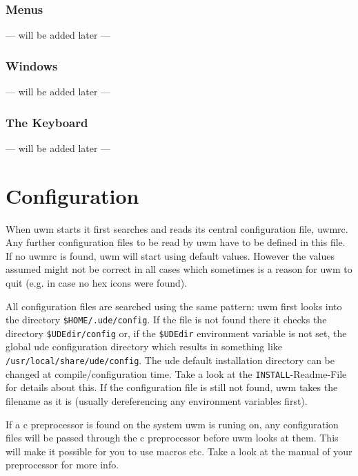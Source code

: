 \documentclass[10pt,a4paper]{article}
\newcommand{\uwm}{{\sc uwm} }
\newcommand{\ude}{{\sc ude} }
\begin{document}
\section{Menus}
\begin{center} --- will be added later --- \end{center}
\section{Windows}
\begin{center} --- will be added later --- \end{center}
\section{The Keyboard}
\begin{center} --- will be added later --- \end{center}

\part{Configuration}\label{Configuration}
When \uwm starts it first searches and reads its central configuration file, \textsf{uwmrc}. Any further configuration files to be read by \uwm have to be defined in this file. If no \textsf{uwmrc} is found, \uwm will start using default values. However the values assumed might not be correct in all cases which sometimes is a reason for uwm to quit (e.g. in case no hex icons were found).

All configuration files are searched using the same pattern: \uwm first looks into the directory \texttt{\$HOME/.ude/config}. If the file is not found there it checks the directory \texttt{\$UDEdir/config} or, if the \texttt{\$UDEdir} environment variable is not set, the global \ude configuration directory which results in something like \texttt{/usr/local/share/ude/config}. The \ude default installation directory can be changed at compile/configuration time. Take a look at the \texttt{INSTALL}-Readme-File for details about this. If the configuration file is still not found, \uwm takes the filename as it is (usually dereferencing any environment variables first).

If a c preprocessor is found on the system \uwm is runing on, any configuration files will be passed through the c preprocessor before \uwm looks at them. This will make it possible for you to use macros etc. Take a look at the manual of your preprocessor for more info.
\end{document}

